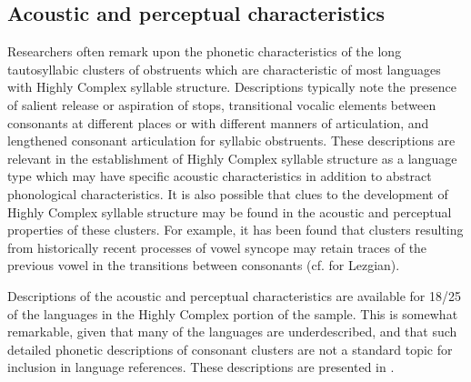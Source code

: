 \subsection{Acoustic and perceptual characteristics}\label{sec:3.4.3}

  Researchers often remark upon the phonetic characteristics of the long tautosyllabic clusters of obstruents which are characteristic of most languages with Highly Complex syllable structure. Descriptions typically note the presence of salient release or aspiration of stops, transitional vocalic elements between consonants at different places or with different manners of articulation, and lengthened consonant articulation for syllabic obstruents. These descriptions are relevant in the establishment of Highly Complex syllable structure as a language type which may have specific acoustic characteristics in addition to abstract phonological characteristics. It is also possible that clues to the development of Highly Complex syllable structure may be found in the acoustic and perceptual properties of these clusters. For example, it has been found that clusters resulting from historically recent processes of vowel syncope may retain traces of the previous vowel in the transitions between consonants (cf. \citealt{ChitoranBabaliyeva2007} for Lezgian).

  Descriptions of the acoustic and perceptual characteristics are available for 18/25 of the languages in the Highly Complex portion of the sample. This is somewhat remarkable, given that many of the languages are underdescribed, and that such detailed phonetic descriptions of consonant clusters are not a standard topic for inclusion in language references. These descriptions are presented in .


